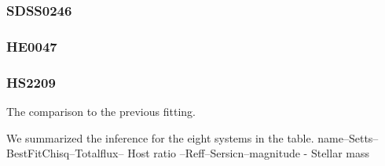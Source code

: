 \documentclass[fleqn,usenatbib]{mnras}
\begin{document}
\subsubsection{SDSS0246}

\subsubsection{HE0047}

\subsubsection{HS2209}

The comparison to the previous fitting.

We summarized the inference for the eight systems in the table.
name--Setts--BestFitChisq--Totalflux-- Host ratio --Reff--Sersicn--magnitude - Stellar mass
\end{document}
